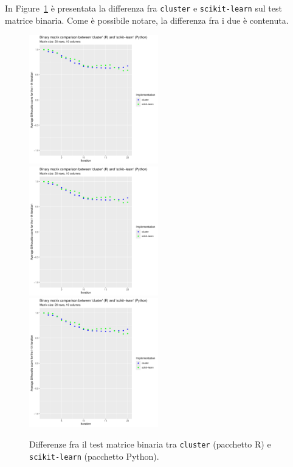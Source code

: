 \documentclass[12pt]{report}
\begin{document}
			In Figure~\ref{fig:cmp} è presentata la differenza fra
			\texttt{cluster} e \texttt{scikit-learn} sul test matrice
			binaria. Come è possibile notare, la differenza fra i due
			è contenuta.

			\begin{figure}[h]
				\centering
				\includegraphics[width = 0.5\textwidth, height = 0.3\textheight, page = 1]{results/Final_comparison.pdf}
				\includegraphics[width = 0.5\textwidth, height = 0.3\textheight, page = 2]{results/Final_comparison.pdf}
				\includegraphics[width = 0.5\textwidth, height = 0.3\textheight, page = 3]{results/Final_comparison.pdf}
				\caption{Differenze fra il test matrice binaria tra \texttt{cluster} (pacchetto R)
				e \texttt{scikit-learn} (pacchetto Python).}
				\label{fig:cmp}
			\end{figure}
\end{document}
